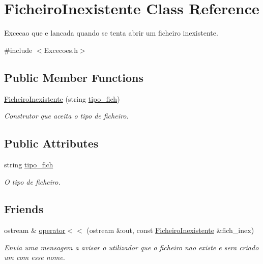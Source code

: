 \hypertarget{class_ficheiro_inexistente}{}\section{Ficheiro\+Inexistente Class Reference}
\label{class_ficheiro_inexistente}


Excecao que e lancada quando se tenta abrir um ficheiro inexistente.  




{\ttfamily \#include $<$Excecoes.\+h$>$}

\subsection*{Public Member Functions}
\begin{DoxyCompactItemize}
\item 
\hyperlink{class_ficheiro_inexistente_a9ea81e48a74c65bcd6b15216d57bc503}{Ficheiro\+Inexistente} (string \hyperlink{class_ficheiro_inexistente_ac848deed05e95fdd183bba69cc646577}{tipo\+\_\+fich})
\begin{DoxyCompactList}\small\item\em Construtor que aceita o tipo de ficheiro. \end{DoxyCompactList}\end{DoxyCompactItemize}
\subsection*{Public Attributes}
\begin{DoxyCompactItemize}
\item 
string \hyperlink{class_ficheiro_inexistente_ac848deed05e95fdd183bba69cc646577}{tipo\+\_\+fich}
\begin{DoxyCompactList}\small\item\em O tipo de ficheiro. \end{DoxyCompactList}\end{DoxyCompactItemize}
\subsection*{Friends}
\begin{DoxyCompactItemize}
\item 
ostream \& \hyperlink{class_ficheiro_inexistente_a28e61dd2982f9766b4d8a1615208033e}{operator$<$$<$} (ostream \&out, const \hyperlink{class_ficheiro_inexistente}{Ficheiro\+Inexistente} \&fich\+\_\+inex)
\begin{DoxyCompactList}\small\item\em Envia uma mensagem a avisar o utilizador que o ficheiro nao existe e sera criado um com esse nome. \end{DoxyCompactList}\end{DoxyCompactItemize}


